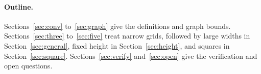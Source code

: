 \paragraph{Outline.} Sections~\ref{sec:conv} to~\ref{sec:graph} give the definitions
and graph bounds. Sections~\ref{sec:three} to~\ref{sec:five} treat narrow grids,
followed by large widths in Section~\ref{sec:general}, fixed height in
Section~\ref{sec:height}, and squares in Section~\ref{sec:square}.
Sections~\ref{sec:verify} and~\ref{sec:open} give the verification and open questions.
